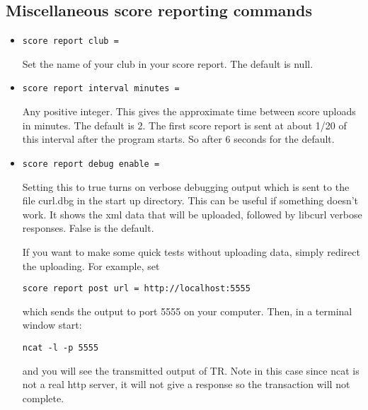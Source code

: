 \documentclass[12pt]{article}
\begin{document}
\subsection{Miscellaneous score reporting commands}
\begin{itemize}
\item
\begin{verbatim}
score report club =
\end{verbatim}
Set the name of your club in your score report. The default is null.

\item
\begin{verbatim}
score report interval minutes =
\end{verbatim}
Any positive integer. This gives the approximate time between score uploads
in minutes. The default is 2. The first score report is sent at about
1/20 of this interval after the program starts. So after 6 seconds for
the default.
\item
\begin{verbatim}
score report debug enable =
\end{verbatim}
Setting this to true turns on verbose debugging output which is sent to
the file curl.dbg in the start up directory. This can be useful if something
doesn't work. It shows the xml data that will be uploaded, followed by
libcurl verbose responses.
False is the default.

If you want to make some quick tests without uploading data, simply redirect
the uploading. For example, set
\begin{verbatim}
score report post url = http://localhost:5555
\end{verbatim}
which sends the output to port 5555 on your computer.
Then, in a terminal window start:
\begin{verbatim}
ncat -l -p 5555
\end{verbatim}
and
you will see the transmitted output of TR. Note in this case
since ncat is not
a real http server, it will not give a response so the transaction will
not complete.

\end{itemize}
\end{document}
